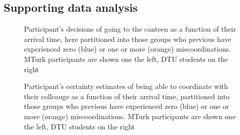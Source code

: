 \documentclass[a4paper,superscriptaddress,nofootinbib]{revtex4}
\begin{document}
\subsection{Supporting data analysis}
\begin{figure} %
\hfill
{}\hfill
\caption{Participant's decisions of going to the canteen as a function of their arrival time, here partitioned into those groups who previous have experienced zero (blue) or one or more (orange) miscoordinations. MTurk participants are shown one the left, DTU students on the right}\label{fig:miscoordinations}
\caption{Participant's certainty estimates of being able to coordinate with their colleauge as a function of their arrival time, partitioned into those groups who previous have experienced zero (blue) or one or more (orange) miscoordinations. MTurk participants are shown one the left, DTU students on the right}\label{fig:certainties}
\end{figure} 
\end{document}
